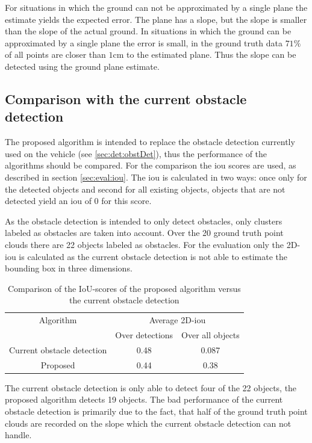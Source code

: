 For situations in which the ground can not be approximated by a single plane the estimate yields the expected error. The plane has a slope, but the slope is smaller than the slope of the actual ground.
In situations in which the ground can be approximated by a single plane the error is small, in the ground truth data $71\%$ of all points are closer than $1\si{\cm}$ to the estimated plane. Thus the slope can be detected using the ground plane estimate. 

\subsection{Comparison with the current obstacle detection}
The proposed algorithm is intended to replace the obstacle detection currently used on the vehicle (see \ref{sec:det:obstDet}), thus the performance of the algorithms should be compared.
For the comparison the \ac{iou} scores are used, as described in section \ref{sec:eval:iou}.
The \ac{iou} is calculated in two ways: once only for the detected objects and second for all existing objects, objects that are not detected yield an \ac{iou} of $0$ for this score.

As the obstacle detection is intended to only detect obstacles, only clusters labeled as obstacles are taken into account. Over the 20 ground truth point clouds there are 22 objects labeled as obstacles. For the evaluation only the 2D-\ac{iou} is calculated as the current obstacle detection is not able to estimate the bounding box in three dimensions.

\begin{table}[h!]
    \centering
    \begin{tabular}{c|cc}
        \toprule
        Algorithm & \multicolumn{2}{c}{Average 2D-\ac{iou}} \\
         & Over detections & Over all objects \\
        \midrule
        Current obstacle detection & 0.48 & 0.087 \\
        Proposed & 0.44 & 0.38 \\
        \bottomrule
    \end{tabular}
    \caption{Comparison of the IoU-scores of the proposed algorithm versus the current obstacle detection}
    \label{tab:eval:compOld}
\end{table}

The current obstacle detection is only able to detect four of the 22 objects, the proposed algorithm detects 19 objects. The bad performance of the current obstacle detection is primarily due to the fact, that half of the ground truth point clouds are recorded on the slope which the current obstacle detection can not handle.

